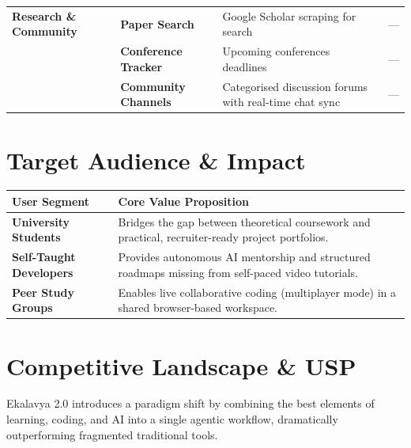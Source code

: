 \documentclass[11pt, a4paper]{article}
\begin{document}
{\begin{longtable}{@{} 
    >{\raggedright\bfseries}p{3cm} 
    >{\raggedright\bfseries}p{3.5cm} 
    >{\raggedright}p{7cm} 
    >{\raggedright\arraybackslash}p{2.5cm} @{}}
\textbf{Research \& \newline Community} & Paper Search & Google Scholar scraping for search & --- \\
 & Conference Tracker & Upcoming conferences deadlines & --- \\
 & Community Channels & Categorised discussion forums with real-time chat sync & --- \\

\end{longtable}
}

\vspace{10pt}

\section{Target Audience \& Impact}

\begin{table}[H]
\centering
\renewcommand{\arraystretch}{1.3}
\begin{tabularx}{\textwidth}{@{} >{\bfseries}p{4.5cm} X @{}}
\toprule
\textbf{User Segment} & \textbf{Core Value Proposition} \\
\midrule
University Students & Bridges the gap between theoretical coursework and practical, recruiter-ready project portfolios. \\
Self-Taught Developers & Provides autonomous AI mentorship and structured roadmaps missing from self-paced video tutorials. \\
Peer Study Groups & Enables live collaborative coding (multiplayer mode) in a shared browser-based workspace. \\
\bottomrule
\end{tabularx}
\end{table}

\newpage

\section{Competitive Landscape \& USP}

Ekalavya 2.0 introduces a paradigm shift by combining the best elements of learning, coding, and AI into a single agentic workflow, dramatically outperforming fragmented traditional tools.
\end{document}
